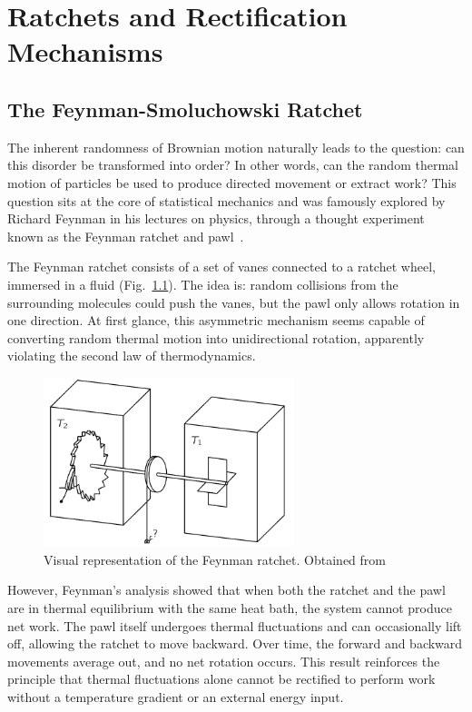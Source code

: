 \chapter{Ratchets and Rectification Mechanisms}
\label{ch:ratchetsandrectificationmechanisms}

\section{The Feynman-Smoluchowski Ratchet}

The inherent randomness of Brownian motion naturally leads to the question: can this disorder be transformed into order? In other words, can the random thermal motion of particles be used to produce directed movement or extract work? This question sits at the core of statistical mechanics and was famously explored by Richard Feynman in his lectures on physics, through a thought experiment known as the Feynman ratchet and pawl~\cite{feynman1963feynman}.

The Feynman ratchet consists of a set of vanes connected to a ratchet wheel, immersed in a fluid (Fig.~\ref{fig:feynmanratchet}). The idea is: random collisions from the surrounding molecules could push the vanes, but the pawl only allows rotation in one direction. At first glance, this asymmetric mechanism seems capable of converting random thermal motion into unidirectional rotation, apparently violating the second law of thermodynamics.
\begin{figure}
  \begin{center}
    \includegraphics[width=0.65\textwidth]{figures/feynmanratchet.png}
  \end{center}
  \caption[Feynman ratchet]{Visual representation of the Feynman ratchet. Obtained from \cite{feynman1963feynman}}\label{fig:feynmanratchet}
\end{figure}


However, Feynman's analysis showed that when both the ratchet and the pawl are in thermal equilibrium with the same heat bath, the system cannot produce net work. The pawl itself undergoes thermal fluctuations and can occasionally lift off, allowing the ratchet to move backward. Over time, the forward and backward movements average out, and no net rotation occurs. This result reinforces the principle that thermal fluctuations alone cannot be rectified to perform work without a temperature gradient or an external energy input.

